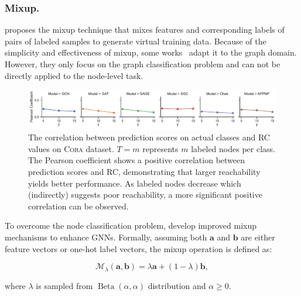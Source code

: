 \documentclass[letterpaper]{article} %
\newcommand{\aVec}[1]{\mathbf{#1}}
\DeclareMathOperator{\betadist}{Beta}
\begin{document}
\subsubsection{Mixup.}
\cite{mixup} proposes the mixup technique that mixes features and corresponding labels of pairs of labeled samples to generate virtual training data. Because of the simplicity and effectiveness of mixup, some works~\cite{mixup_metric_g,mixup_transplant_g,ifmixup_g,graphmad_g} adapt it to the graph domain. However, they only focus on the graph classification problem and can not be directly applied to the node-level task.
\begin{figure}[!htbp]
	\centering
    \includegraphics[width=1\linewidth]{figs/pearson_cora.pdf}
    \caption{The correlation between prediction scores on actual classes and RC values on \textsc{Cora} dataset. $T = m$ represents $m$ labeled nodes per class. The Pearson coefficient shows a positive correlation between prediction scores and RC, demonstrating that larger reachability yields better performance. As labeled nodes decrease which (indirectly) suggests poor reachability, a more significant positive correlation can be observed.}
    \label{fig:pearson}
\end{figure}
To overcome the node classification problem, \cite{graphmixup,mixup_for_node,graphmix} develop improved mixup mechanisms to enhance GNNs. Formally, assuming both $\aVec{a}$ and $\aVec{b}$ are either feature vectors or one-hot label vectors, the mixup operation is defined as:
\begin{small}
	\begin{equation}
	\label{eq:mixup}
	\mathcal{M}_{\lambda}(\aVec{a}, \aVec{b}) = \lambda \aVec{a} + (1-\lambda) \aVec{b},
	\end{equation}
\end{small}where $\lambda$ is sampled from $\betadist(\alpha, \alpha)$ distribution and $\alpha \geq 0$.
\end{document}
